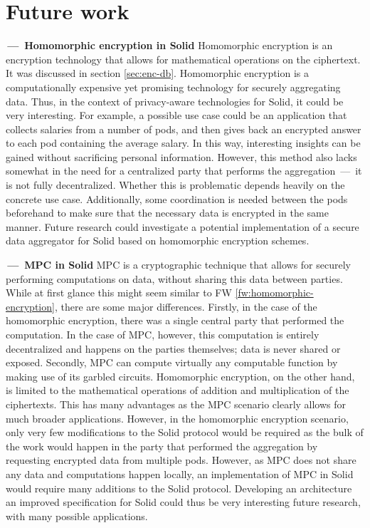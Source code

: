 \section{Future work}
\label{sec:future-work}
\begin{futurework}\label{fw:homomorphic-encryption}
\textbf{\,---\, Homomorphic encryption in Solid} Homomorphic encryption is an encryption technology that allows for mathematical operations on the ciphertext. It was discussed in section \ref{sec:enc-db}. Homomorphic encryption is a computationally expensive yet promising technology for securely aggregating data. Thus, in the context of privacy-aware technologies for Solid, it could be very interesting.  For example, a possible use case could be an application that collects salaries from a number of pods, and then gives back an encrypted answer to each pod containing the average salary. In this way, interesting insights can be gained without sacrificing personal information. However, this method also lacks somewhat in the need for a centralized party that performs the aggregation \,---\, it is not fully decentralized. Whether this is problematic depends heavily on the concrete use case. Additionally, some coordination is needed between the pods beforehand to make sure that the necessary data is encrypted in the same manner. Future research could investigate a potential implementation of a secure data aggregator for Solid based on homomorphic encryption schemes.
\end{futurework}

\begin{futurework}\label{fw:mpc}
\textbf{\,---\, \gls{MPC} in Solid} \acrlong{MPC} is a cryptographic technique that allows for securely performing computations on data, without sharing this data between parties. While at first glance this might seem similar to FW \ref{fw:homomorphic-encryption}, there are some major differences. Firstly, in the case of the homomorphic encryption, there was a single central party that performed the computation. In the case of \gls{MPC}, however, this computation is entirely decentralized and happens on the parties themselves; data is never shared or exposed. Secondly, \gls{MPC} can compute virtually any computable function by making use of its garbled circuits. Homomorphic encryption, on the other hand, is limited to the mathematical operations of addition and multiplication of the ciphertexts. This has many advantages as the \gls{MPC} scenario clearly allows for much broader applications. However, in the homomorphic encryption scenario, only very few modifications to the Solid protocol would be required as the bulk of the work would happen in the party that performed the aggregation by requesting encrypted data from multiple pods. However, as \gls{MPC} does not share any data and computations happen locally, an implementation of \gls{MPC} in Solid would require many additions to the Solid protocol. Developing an architecture an improved specification for Solid could thus be very interesting future research, with many possible applications.
\end{futurework}

